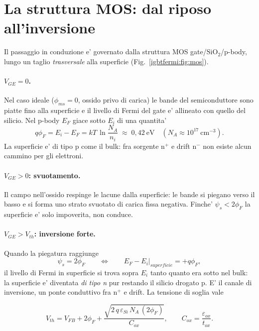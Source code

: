 \section{La struttura MOS: dal riposo all'inversione}

Il passaggio in conduzione e' governato dalla struttura MOS
gate/$\mathrm{SiO_2}$/p-body, lungo un taglio \emph{trasversale} alla
superficie (Fig.~\ref{igbtfermi:fig:mos}).

\paragraph{$V_{GE}=0$.} Nel caso ideale ($\phi_{ms}=0$, ossido privo di carica)
le bande del semiconduttore sono piatte fino alla superficie e il livello di
Fermi del gate e' allineato con quello del silicio. Nel p-body $E_F$ giace
sotto $E_i$ di una quantita'
\begin{equation}
q\phi_F = E_i - E_F = kT\,\ln\!\frac{N_A}{n_i}\;\approx\;0{,}42~\mathrm{eV}
\quad (N_A \approx 10^{17}~\mathrm{cm^{-3}}).
\end{equation}
La superficie e' di tipo p come il bulk: fra sorgente $\mathrm{n^{+}}$ e drift
$\mathrm{n^{-}}$ non esiste alcun cammino per gli elettroni.

\paragraph{$V_{GE}>0$: svuotamento.} Il campo nell'ossido respinge le lacune
dalla superficie: le bande si piegano verso il basso e si forma uno strato
svuotato di carica fissa negativa. Finche' $\psi_s < 2\phi_F$ la superficie e'
solo impoverita, non conduce.

\paragraph{$V_{GE}>V_{th}$: inversione forte.} Quando la piegatura raggiunge
\begin{equation}
\psi_s = 2\phi_F
\qquad\Longleftrightarrow\qquad
E_F - E_i\big|_{superficie} = +q\phi_F ,
\end{equation}
il livello di Fermi in superficie si trova sopra $E_i$ tanto quanto era sotto
nel bulk: la superficie e' diventata \emph{di tipo n} pur restando il silicio
drogato p. E' il canale di inversione, un ponte conduttivo fra
$\mathrm{n^{+}}$ e drift. La tensione di soglia vale

\begin{equation}
V_{th} = V_{FB} + 2\phi_F + \frac{\sqrt{2\,q\,\varepsilon_{Si}\,N_A\,(2\phi_F)}}{C_{ox}},
\qquad C_{ox}=\frac{\varepsilon_{ox}}{t_{ox}} .
\end{equation}

